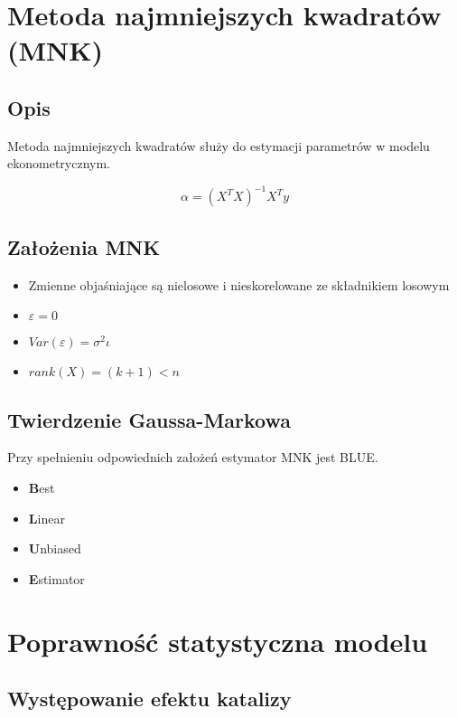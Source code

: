 \section{Metoda najmniejszych kwadratów (MNK)}\label{sec:mnk}

\subsection{Opis}\label{subsec:opis}
Metoda najmniejszych kwadratów służy do estymacji parametrów w modelu ekonometrycznym.

\[ \alpha = (X^{T}X)^{-1}X^{T}y \]

\subsection{Założenia MNK}\label{subsec:założenia-mnk}

\begin{itemize}
    \item Zmienne objaśniające są nielosowe i nieskorelowane ze składnikiem losowym
    \item \(\varepsilon = 0\)
    \item \(Var(\varepsilon) = \sigma^2 \iota \)
    \item \(rank(X) = (k+1) <n\)
\end{itemize}

\subsection{Twierdzenie Gaussa-Markowa}\label{subsec:twierdzenie-gaussa-markowa}
Przy spełnieniu odpowiednich założeń estymator  MNK jest BLUE.
\begin{itemize}
    \item \textbf{B}est
    \item \textbf{L}inear
    \item \textbf{U}nbiased
    \item \textbf{E}stimator
\end{itemize}

\section {Poprawność statystyczna modelu}\label{sec:poprawność-statystyczna-modelu}

\subsection{Występowanie efektu katalizy}\label{subsec:występowanie-efektu-katalizy}


